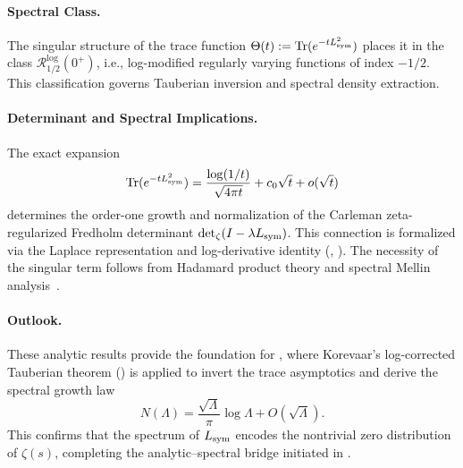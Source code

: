 \paragraph{Spectral Class.}
The singular structure of the trace function \( \Theta(t) := \operatorname{Tr}(e^{-t L_{\mathrm{sym}}^2}) \) places it in the class \( \mathcal{R}_{1/2}^{\log}(0^+) \), i.e., log-modified regularly varying functions of index \( -1/2 \). This classification governs Tauberian inversion and spectral density extraction.

\paragraph{Determinant and Spectral Implications.}
The exact expansion
\[
\operatorname{Tr}(e^{-t L_{\mathrm{sym}}^2}) = \frac{\log(1/t)}{\sqrt{4\pi t}} + c_0 \sqrt{t} + o(\sqrt{t})
\]
determines the order-one growth and normalization of the Carleman zeta-regularized Fredholm determinant \( \det\nolimits_{\zeta}(I - \lambda L_{\mathrm{sym}}) \). This connection is formalized via the Laplace representation and log-derivative identity (, ). The necessity of the singular term follows from Hadamard product theory and spectral Mellin analysis~\cite[Ch.~III]{Korevaar2004Tauberian}.

\paragraph{Outlook.}
These analytic results provide the foundation for , where Korevaar’s log-corrected Tauberian theorem () is applied to invert the trace asymptotics and derive the spectral growth law
\[
N(\Lambda) = \frac{\sqrt{\Lambda}}{\pi} \log \Lambda + O(\sqrt{\Lambda}).
\]
This confirms that the spectrum of \( L_{\mathrm{sym}} \) encodes the nontrivial zero distribution of \( \zeta(s) \), completing the analytic–spectral bridge initiated in .
